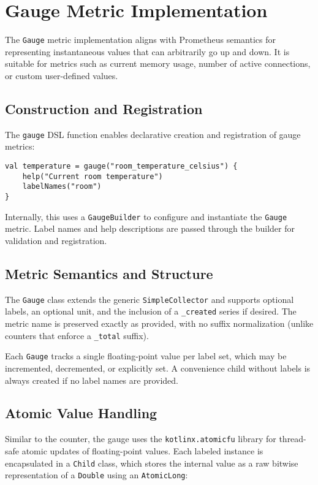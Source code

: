

\section{Gauge Metric Implementation}

The \texttt{Gauge} metric implementation aligns with Prometheus semantics for representing instantaneous values that can arbitrarily go up and down. It is suitable for metrics such as current memory usage, number of active connections, or custom user-defined values.

\subsection{Construction and Registration}
The \texttt{gauge} DSL function enables declarative creation and registration of gauge metrics:
\begin{verbatim}
val temperature = gauge("room_temperature_celsius") {
    help("Current room temperature")
    labelNames("room")
}
\end{verbatim}
Internally, this uses a \texttt{GaugeBuilder} to configure and instantiate the \texttt{Gauge} metric. Label names and help descriptions are passed through the builder for validation and registration.





\subsection{Metric Semantics and Structure}
The \texttt{Gauge} class extends the generic 
\texttt{SimpleCollector} and supports optional labels, 
an optional unit, and the inclusion of a \texttt{\_created} series if desired. 
The metric name is preserved exactly as provided, with no suffix normalization (unlike counters that enforce a \texttt{\_total} suffix).

Each \texttt{Gauge} tracks a single floating-point value per label set, which may be incremented, decremented, or explicitly set. A convenience child without labels is always created if no label names are provided.



\subsection{Atomic Value Handling}
Similar to the counter, the gauge uses the \texttt{kotlinx.atomicfu} library for thread-safe atomic updates of floating-point values. Each labeled instance is encapsulated in a \texttt{Child} class, which stores the internal value as a raw bitwise representation of a \texttt{Double} using an \texttt{AtomicLong}:

